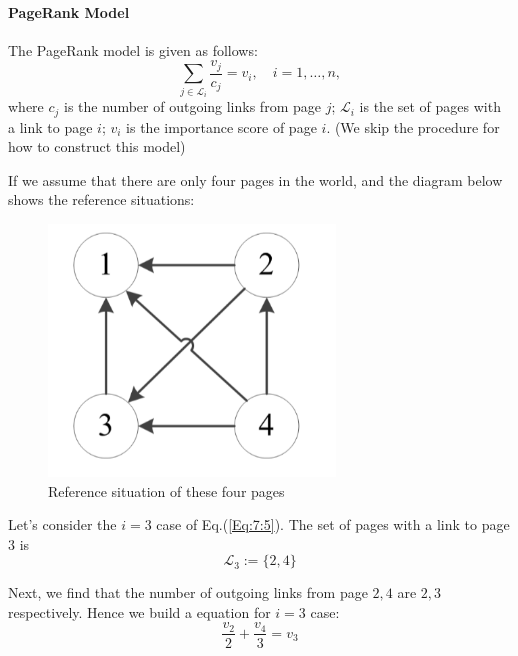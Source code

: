 \paragraph{PageRank Model} The PageRank model is given as follows:
\begin{equation}
\sum_{j\in\mathcal{L}_i}\frac{v_j}{c_j}=v_i,\quad
i=1,\dots,n,\label{Eq:7:5}
\end{equation}
where $c_j$ is the number of outgoing links from page $j$; $\mathcal{L}_i$ is the set of pages with
a link to page $i$; $v_i$ is the importance score of page $i$. (We skip the procedure for how to construct this model)
\begin{example}
If we assume that there are only four pages in the world, and the diagram below shows the reference situations:
\begin{figure}[H]
\centering
\includegraphics[width=3in]{week6/Fig_3.png}
\caption{Reference situation of these four pages}
\label{fig:7:3}
\end{figure}
Let's consider the $i=3$ case of Eq.(\ref{Eq:7:5}). The set of pages with a link to page $3$ is
\[
\mathcal{L}_3:=\{2,4\}
\]

Next, we find that the number of outgoing links from page $2,4$ are $2,3$ respectively. Hence we build a equation for $i=3$ case:
\[
\frac{v_2}{2}+\frac{v_4}{3}=v_3
\]


\end{example}
